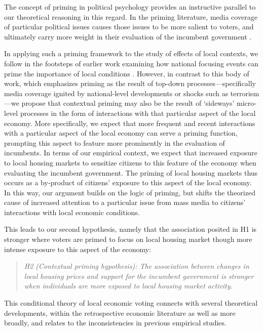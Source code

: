 \documentclass[12pt,a4paper]{article}
\begin{document}
	The concept of priming in political psychology provides an instructive parallel to our theoretical reasoning in this regard. In the priming literature, media coverage of particular political issues causes those issues to be more salient to voters, and ultimately carry more weight in their evaluation of the incumbent government \citep{(iyengar1982experimental,iyengar1987news,krosnick1990altering}. 
	
	In applying such a priming framework to the study of effects of local contexts, we follow in the footsteps of earlier work examining how national focusing events can prime the importance of local conditions \citep[e.g.,] []{hopkins2010politicized,legewie2013terrorist}. However, in contrast to this body of work, which emphasizes priming as the result of top-down processes—specifically media coverage ignited by national-level developments or shocks such as terrorism—we propose that contextual priming may also be the result of `sideways’ micro-level processes in the form of interactions with that particular aspect of the local economy. More specifically, we expect that more frequent and recent interactions with a particular aspect of the local economy can serve a priming function, prompting this aspect to feature more prominently in the evaluation of incumbents. In terms of our empirical context, we expect that increased exposure to local housing markets to sensitize citizens to this feature of the economy when evaluating the incumbent government. The priming of local housing markets thus occurs as a by-product of citizens’ exposure to this aspect of the local economy. In this way, our argument builds on the logic of priming, but shifts the theorized cause of increased attention to a particular issue from mass media to citizens’ interactions with local economic conditions.
	
	This leads to our second hypothesis, namely that the association posited in H1 is stronger where voters are primed to focus on local housing market though more intense exposure to this aspect of the economy:
	
	\newcommand{\htwo}{the contextual priming hypothesis}
	\begin{quote}
		\textit{H2 (Contextual priming hypothesis): The association between changes in local housing prices and support for the incumbent government is stronger when individuals are more exposed to local housing market activity.}
	\end{quote}
	
	This conditional theory of local economic voting connects with several theoretical developments, within the retrospective economic literature as well as more broadly, and relates to the inconsistencies in previous empirical studies. 
	
\end{document}
